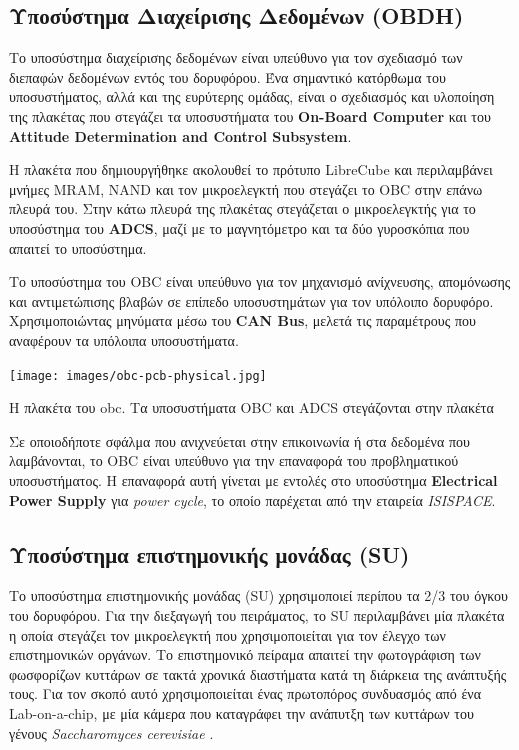 \documentclass[a4paper,nobib,justified]{tufte-book}
\begin{document}
\subsection{Υποσύστημα Διαχείρισης Δεδομένων (\acs{OBDH})}
Το υποσύστημα διαχείρισης δεδομένων είναι υπεύθυνο για τον σχεδιασμό των διεπαφών δεδομένων εντός του δορυφόρου. Ένα σημαντικό κατόρθωμα του υποσυστήματος, αλλά και της ευρύτερης ομάδας, είναι ο σχεδιασμός και υλοποίηση της πλακέτας που στεγάζει τα υποσυστήματα του \textbf{On-Board Computer} και του \textbf{Attitude Determination and Control Subsystem}.

Η πλακέτα που δημιουργήθηκε ακολουθεί το πρότυπο LibreCube και περιλαμβάνει μνήμες MRAM, NAND και τον μικροελεγκτή που στεγάζει το OBC στην επάνω πλευρά του. Στην κάτω πλευρά της πλακέτας στεγάζεται ο μικροελεγκτής για το υποσύστημα του \textbf{ADCS}, μαζί με το μαγνητόμετρο και τα δύο γυροσκόπια που απαιτεί το υποσύστημα.

Το υποσύστημα του OBC είναι υπεύθυνο για τον μηχανισμό ανίχνευσης, απομόνωσης και αντιμετώπισης βλαβών σε επίπεδο υποσυστημάτων για τον υπόλοιπο δορυφόρο. Χρησιμοποιώντας μηνύματα μέσω του \textbf{CAN Bus}, μελετά τις παραμέτρους που αναφέρουν τα υπόλοιπα υποσυστήματα.\begin{marginfigure}
	\texttt{[image: images/obc-pcb-physical.jpg]}
	\label{fig:obc-pcb}
	\caption[Η πλακέτα του obc]{Η πλακέτα του obc. Τα υποσυστήματα OBC και ADCS στεγάζονται στην πλακέτα}
\end{marginfigure} Σε οποιοδήποτε σφάλμα που ανιχνεύεται στην επικοινωνία ή στα δεδομένα που λαμβάνονται, το OBC είναι υπεύθυνο για την επαναφορά του προβληματικού υποσυστήματος. Η επαναφορά αυτή γίνεται με εντολές στο υποσύστημα \textbf{Electrical Power Supply} για \emph{power cycle}, το οποίο παρέχεται από την εταιρεία \emph{ISISPACE}.

\subsection{Υποσύστημα επιστημονικής μονάδας (\acs{SU})}

Το υποσύστημα επιστημονικής μονάδας (SU) χρησιμοποιεί περίπου τα 2/3 του όγκου του δορυφόρου. Για την διεξαγωγή του πειράματος, το \acs{SU} περιλαμβάνει μία πλακέτα η οποία στεγάζει τον μικροελεγκτή που χρησιμοποιείται για τον έλεγχο των επιστημονικών οργάνων. Το επιστημονικό πείραμα απαιτεί την φωτογράφιση των φωσφορίζων κυττάρων σε τακτά χρονικά διαστήματα κατά τη διάρκεια της ανάπτυξής τους. Για τον σκοπό αυτό χρησιμοποιείται ένας πρωτοπόρος συνδυασμός από ένα Lab-on-a-chip, με μία κάμερα που καταγράφει την ανάπυτξη των κυττάρων του γένους \textit{Saccharomyces cerevisiae} .
\end{document}
